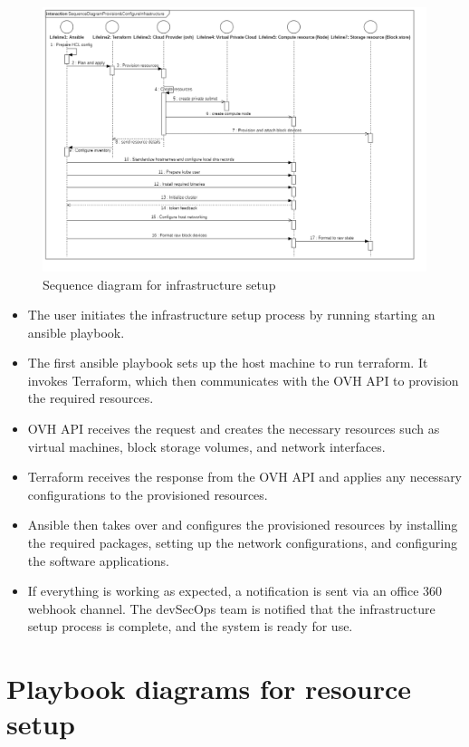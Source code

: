 \begin{figure}[H]\centering
\includegraphics[width=1.0\textwidth,angle=00]{assets/f16.png}
\caption{Sequence diagram for infrastructure setup}
\label{fig:Sequence diagram for infrastructure setup}
\end{figure}

\begin{itemize}[label={--}]
    \item The user initiates the infrastructure setup process by running starting an ansible playbook.
    \item The first ansible playbook sets up the host machine to run terraform. It invokes Terraform, which then communicates with the OVH API to provision the required resources.
    \item OVH API receives the request and creates the necessary resources such as virtual machines, block storage volumes, and network interfaces.
    \item Terraform receives the response from the OVH API and applies any necessary configurations to the provisioned resources.
    \item Ansible then takes over and configures the provisioned resources by installing the required packages, setting up the network configurations, and configuring the software applications.
    \item If everything is working as expected, a notification is sent via an office 360 webhook channel. The devSecOps team is notified that the infrastructure setup process is complete, and the system is ready for use.
\end{itemize}

\section{Playbook diagrams for resource setup}

